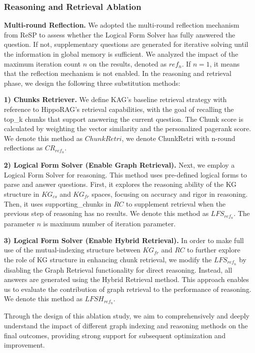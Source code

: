 \documentclass{article}
\begin{document}
\subsubsection{Reasoning and Retrieval Ablation}

\textbf{Multi-round Reflection.} We adopted the multi-round reflection mechanism from ReSP\cite{jiang2024retrieve} to assess whether the Logical Form Solver has fully answered the question. If not, supplementary questions are generated for iterative solving until the information in global memory is sufficient. We analyzed the impact of the maximum iteration count $n$ on the results, denoted as $ref_{n}$. If $n=1$, it means that the reflection mechanism is not enabled. In the reasoning and retrieval phase, we design the following three substitution methods: \newline

\textbf{1) Chunks Retriever.} We define KAG's baseline retrieval strategy with reference to HippoRAG's\cite{gutierrez2024hipporag} retrieval capabilities, with the goal of recalling the top\_k chunks that support answering the current question. The Chunk score is calculated by weighting the vector similarity and the personalized pagerank score. We denote this method as $ChunkRetri$, we denote ChunkRetri with n-round reflections as $CR_{ref_{n}}$. 

\textbf{2) Logical Form Solver (Enable Graph Retrieval).} Next, we employ a Logical Form Solver for reasoning. This method uses pre-defined logical forms to parse and answer questions. First, it explores the reasoning ability of the KG structure in $KG_{cs}$ and $KG_{fr}$ spaces, focusing on accuracy and rigor in reasoning. Then, it uses supporting\_chunks in $RC$ to supplement retrieval when the previous step of reasoning has no results. We denote this method as $LFS_{ref_{n}}$. The parameter $n$ is maximum number of iteration parameter.
   
\textbf{3) Logical Form Solver (Enable Hybrid Retrieval).} In order to make full use of the mutual-indexing structure between $KG_{fr}$ and $RC$ to further explore the role of KG structure in enhancing chunk retrieval, we modify the $LFS_{ref_{n}}$ by disabling the Graph Retrieval functionality for direct reasoning. Instead, all answers are generated using the Hybrid Retrieval method. This approach enables us to evaluate the contribution of graph retrieval to the performance of reasoning. We denote this method as $LFSH_{ref_{n}}$.

Through the design of this ablation study, we aim to comprehensively and deeply understand the impact of different graph indexing and reasoning methods on the final outcomes, providing strong support for subsequent optimization and improvement.
\end{document}
